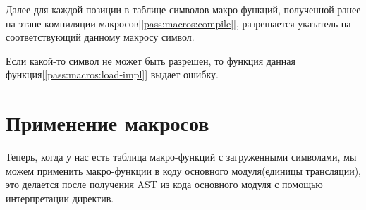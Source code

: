 Далее для каждой позиции в таблице символов макро-функций, полученной ранее на этапе компиляции макросов[\ref{pass:macros:compile}], 
разрешается указатель на соответствующий данному макросу символ.

Если какой-то символ не может быть разрешен, то функция данная функция[\ref{pass:macros:load-impl}] выдает ошибку.

\section{Применение макросов}
\label{pass:macros:apply}

Теперь, когда у нас есть таблица макро-функций с загруженными символами, мы можем применить макро-функции в коду основного модуля(единицы трансляции),
это делается после получения AST из кода основного модуля с помощью интерпретации директив.

